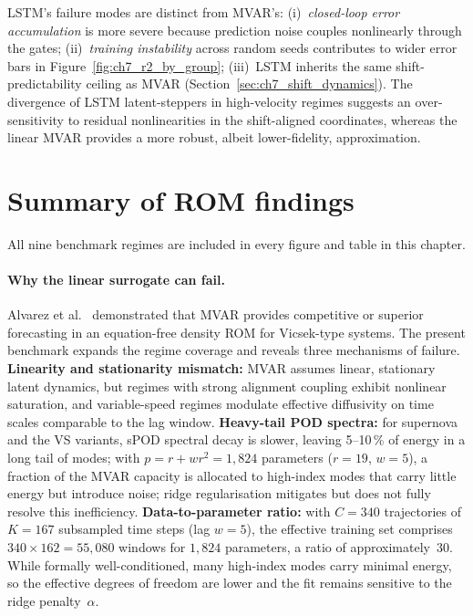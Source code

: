 LSTM's failure modes are distinct from MVAR's: (i)~\emph{closed-loop
error accumulation} is more severe because prediction noise couples
nonlinearly through the gates; (ii)~\emph{training instability} across
random seeds contributes to wider error bars in
Figure~\ref{fig:ch7_r2_by_group}; (iii)~LSTM inherits the same
shift-predictability ceiling as MVAR (Section~\ref{sec:ch7_shift_dynamics}).
The divergence of LSTM latent-steppers in high-velocity regimes
suggests an over-sensitivity to residual nonlinearities in the
shift-aligned coordinates, whereas the linear MVAR provides a more
robust, albeit lower-fidelity, approximation.

\section{Summary of ROM findings}
\label{sec:ch7_summary}

All nine benchmark regimes are included in every figure and table in
this chapter.

\paragraph{Why the linear surrogate can fail.}
\label{sec:ch7_mvar_failure}

Alvarez et al.~\cite{alvarez2025eqfree} demonstrated that MVAR provides
competitive or superior forecasting in an equation-free density ROM for
Vicsek-type systems.  The present benchmark expands the regime coverage
and reveals three mechanisms of failure.
\textbf{Linearity and stationarity mismatch:}
MVAR assumes linear, stationary latent dynamics, but regimes with strong
alignment coupling exhibit nonlinear saturation, and variable-speed regimes
modulate effective diffusivity on time scales comparable to the lag window.
\textbf{Heavy-tail POD spectra:}
for supernova and the VS variants, sPOD spectral decay is slower, leaving
5--10\,\% of energy in a long tail of modes; with
$p = r + wr^2 = 1{,}824$ parameters ($r{=}19$, $w{=}5$), a fraction of
the MVAR capacity is allocated to high-index modes that carry little energy
but introduce noise; ridge regularisation mitigates but does not fully
resolve this inefficiency.
\textbf{Data-to-parameter ratio:}
with $C{=}340$ trajectories of $K{=}167$ subsampled time steps
(lag $w{=}5$), the effective training set comprises
$340 \times 162 = 55{,}080$ windows for $1{,}824$ parameters, a ratio of
approximately~$30$.
While formally well-conditioned, many high-index modes carry minimal energy,
so the effective degrees of freedom are lower and the fit remains
sensitive to the ridge penalty~$\alpha$.

